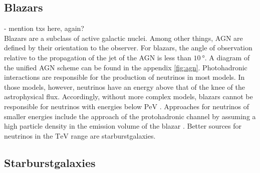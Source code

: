 \subsection{Blazars}
- mention txs here, again? \\
Blazars are a subclass of active galactic nuclei.
Among other things, AGN are defined by their orientation to the observer.
For blazars, the angle of observation relative to the propagation of the jet of the AGN is less than $\SI{10}{\degree}$.
A diagram of the unified AGN scheme can be found in the appendix \ref{fig:agn}.
Photohadronic interactions are responsible for the production of neutrinos in most models.
In those models, however, neutrinos have an energy above that of the knee of the astrophysical flux.
Accordingly, without more complex models, blazars cannot be responsible for neutrinos with energies below $\si{\peta\electronvolt}$ \cite{blazar}.
Approaches for neutrinos of smaller energies include the approach of the protohadronic channel by assuming a high particle density in the emission volume of the blazar \cite{eichmann}.
Better sources for neutrinos in the $\si{\tera\electronvolt}$ range are starburstgalaxies.

\subsection{Starburstgalaxies}

